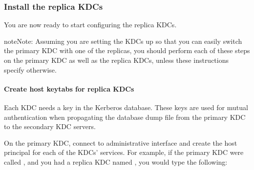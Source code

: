 \documentclass[letterpaper,10pt,english]{sphinxmanual}
\begin{document}
\subsubsection{Install the replica KDCs}
\label{\detokenize{admin/install_kdc:install-the-replica-kdcs}}
You are now ready to start configuring the replica KDCs.

\begin{sphinxadmonition}{note}{Note:}
Assuming you are setting the KDCs up so that you can easily
switch the primary KDC with one of the replicas, you should
perform each of these steps on the primary KDC as well as
the replica KDCs, unless these instructions specify
otherwise.
\end{sphinxadmonition}


\paragraph{Create host keytabs for replica KDCs}
\label{\detokenize{admin/install_kdc:create-host-keytabs-for-replica-kdcs}}\label{\detokenize{admin/install_kdc:replica-host-key}}
Each KDC needs a  key in the Kerberos database.  These keys
are used for mutual authentication when propagating the database dump
file from the primary KDC to the secondary KDC servers.

On the primary KDC, connect to administrative interface and create the
host principal for each of the KDCs’  services.  For example,
if the primary KDC were called , and you had a
replica KDC named , you would type the
following:

%
\begin{sphinxVerbatim}[commandchars=\\\{\}]
 
   
      
  

   
      
  
\end{sphinxVerbatim}
\end{document}

